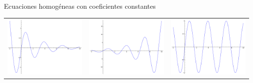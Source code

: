 \documentclass[handout,hyperref={colorlinks=true}]{beamer}
\begin{document}
\begin{frame}{Ecuaciones homogéneas con coeficientes constantes}
 
\begin{tabular}{c c c}
 \includegraphics[scale=.1]{imagenes/mu_neg.png} & \includegraphics[scale=.1]{imagenes/mu_pos.png}  &
 \includegraphics[scale=.1]{imagenes/mu_cero.png}\\

\end{tabular}
\end{frame}
\end{document}
